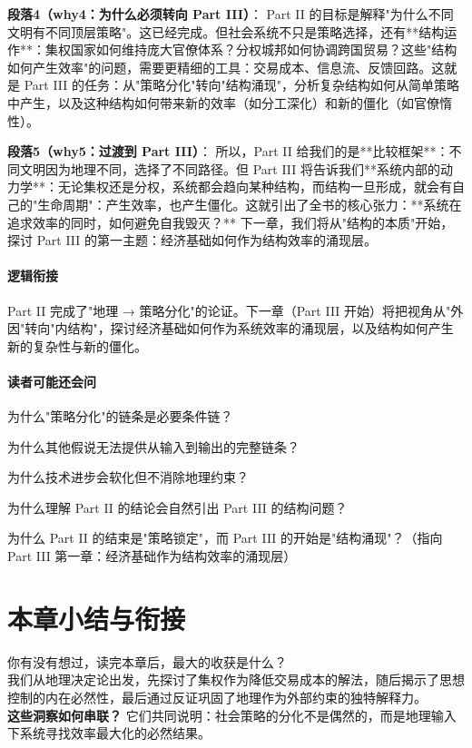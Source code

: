 \documentclass[openany, a4paper, 12pt]{book}
\begin{document}
	\textbf{段落4（why4：为什么必须转向 Part III）}：  
	Part II 的目标是解释"为什么不同文明有不同顶层策略"。这已经完成。但社会系统不只是策略选择，还有**结构运作**：集权国家如何维持庞大官僚体系？分权城邦如何协调跨国贸易？这些"结构如何产生效率"的问题，需要更精细的工具：交易成本、信息流、反馈回路。这就是 Part III 的任务：从"策略分化"转向"结构涌现"，分析复杂结构如何从简单策略中产生，以及这种结构如何带来新的效率（如分工深化）和新的僵化（如官僚惰性）。
	
	\textbf{段落5（why5：过渡到 Part III）}：  
	所以，Part II 给我们的是**比较框架**：不同文明因为地理不同，选择了不同路径。但 Part III 将告诉我们**系统内部的动力学**：无论集权还是分权，系统都会趋向某种结构，而结构一旦形成，就会有自己的"生命周期"：产生效率，也产生僵化。这就引出了全书的核心张力：**系统在追求效率的同时，如何避免自我毁灭？** 下一章，我们将从"结构的本质"开始，探讨 Part III 的第一主题：经济基础如何作为结构效率的涌现层。
	
	\paragraph*{逻辑衔接}
	Part II 完成了"地理 → 策略分化"的论证。下一章（Part III 开始）将把视角从"外因"转向"内结构"，探讨经济基础如何作为系统效率的涌现层，以及结构如何产生新的复杂性与新的僵化。
	
	\paragraph*{读者可能还会问}
	\item 为什么"策略分化"的链条是必要条件链？
	\item 为什么其他假说无法提供从输入到输出的完整链条？
	\item 为什么技术进步会软化但不消除地理约束？
	\item 为什么理解 Part II 的结论会自然引出 Part III 的结构问题？
	\item 为什么 Part II 的结束是"策略锁定"，而 Part III 的开始是"结构涌现"？（指向 Part III 第一章：经济基础作为结构效率的涌现层）
	
\section{本章小结与衔接}

\begin{readingnote}
	你有没有想过，读完本章后，最大的收获是什么？\\
	我们从地理决定论出发，先探讨了集权作为降低交易成本的解法，随后揭示了思想控制的内在必然性，最后通过反证巩固了地理作为外部约束的独特解释力。\\
	\textbf{这些洞察如何串联？} 它们共同说明：社会策略的分化不是偶然的，而是地理输入下系统寻找效率最大化的必然结果。
\end{readingnote}
\end{document}
